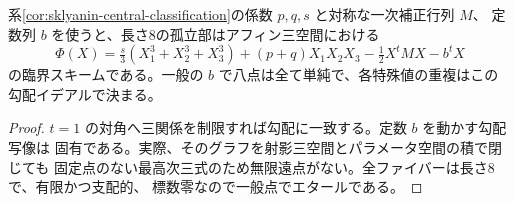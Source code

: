 \begin{corollary}
系\ref{cor:sklyanin-central-classification}の係数 $p,q,s$ と対称な一次補正行列 $M$、
定数列 $b$ を使うと、長さ8の孤立部はアフィン三空間における
\[
 \Phi(X)=\tfrac{s}{3}(X_1^3+X_2^3+X_3^3)+(p+q)X_1X_2X_3
           -\tfrac12 X^tMX-b^t X
\]
の臨界スキームである。一般の $b$ で八点は全て単純で、各特殊値の重複はこの勾配イデアルで決まる。
\end{corollary}
\begin{proof}
$t=1$ の対角へ三関係を制限すれば勾配に一致する。定数 $b$ を動かす勾配写像は
固有である。実際、そのグラフを射影三空間とパラメータ空間の積で閉じても
固定点のない最高次三式のため無限遠点がない。全ファイバーは長さ8で、有限かつ支配的、
標数零なので一般点でエタールである。
\end{proof}
